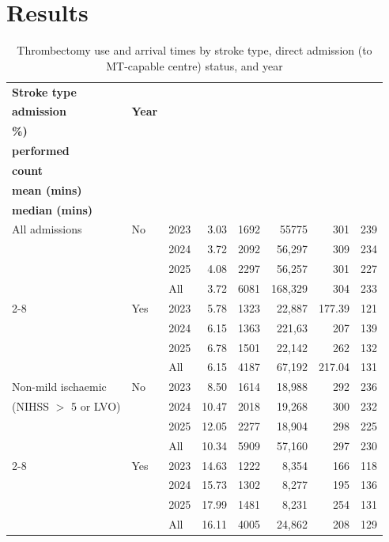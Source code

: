 \section{Results}

\begin{table}[htbp]
\footnotesize
\centering
\caption{Thrombectomy use and arrival times by stroke type, direct admission (to MT-capable centre) status, and year}
\label{tab:thrombectomy}
\begin{tabular}{l  l l r r r r r }
\hline
\textbf{Stroke type} &
\makecell{\textbf{Direct}\\\textbf{admission}} &
\textbf{Year} &
\makecell{\textbf{MT use}\\\textbf{\%)}} &
\makecell{\textbf{\# MT}\\\textbf{performed}} &
\makecell{\textbf{Patient}\\\textbf{count}} &
\makecell{\textbf{Arrival to MT}\\\textbf{mean (mins)}} &
\makecell{\textbf{Arrival to MT}\\\textbf{median (mins)}} \\
\hline
All admissions & No & 2023 & 3.03 & 1692 & 55775 & 301 & 239 \\
 &  & 2024 & 3.72 & 2092 & 56,297 & 309 & 234 \\
 &  & 2025 & 4.08 & 2297 & 56,257 & 301 & 227 \\
 &  & All & 3.72 & 6081 & 168,329 & 304 & 233 \\
\cline{2-8}
 & Yes & 2023 & 5.78 & 1323 & 22,887 & 177.39 & 121 \\
 &  & 2024 & 6.15 & 1363 & 221,63 & 207 & 139 \\
 &  & 2025 & 6.78 & 1501 & 22,142 & 262 & 132 \\
 &  & All & 6.15 & 4187 & 67,192 & 217.04 & 131 \\
\hline
Non-mild ischaemic & No & 2023 & 8.50 & 1614 & 18,988 & 292 & 236 \\
 (NIHSS $>$ 5 or LVO) &  & 2024 & 10.47 & 2018 & 19,268 & 300 & 232 \\
 &  & 2025 & 12.05 & 2277 & 18,904 & 298 & 225 \\
 &  & All & 10.34 & 5909 & 57,160 & 297 & 230 \\
 \cline{2-8}
 & Yes & 2023 & 14.63 & 1222 & 8,354 & 166 & 118 \\
 &  & 2024 & 15.73 & 1302 & 8,277 & 195 & 136 \\
 &  & 2025 & 17.99 & 1481 & 8,231 & 254 & 131 \\
 &  & All & 16.11 & 4005 & 24,862 & 208 & 129 \\
\hline
\end{tabular}
\end{table}

